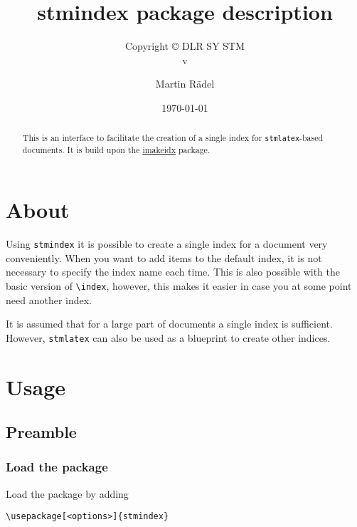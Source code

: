 \documentclass[%
  type=article,%
  layout=koma,%
  conditionallox=true,%
  conditionalloxnewpage=false,%
  date=true,%
  hyperref=true,%
  index=false,%
  listings=true%
]{stmtext}
\author{Martin R\"{a}del}
\title{stmindex package description}
\subtitle{Copyright \copyright{} \the\year{} DLR SY STM\\v\formatdate[versiondatestyle]{\DTMToday}}
\date{\today}
\begin{document}
\maketitle

\begin{abstract}
This is an interface to facilitate the creation of a single index for \texttt{stmlatex}-based documents. It is build upon the \href{https://ctan.org/pkg/imakeidx}{imakeidx} package.
\end{abstract}

\tableofcontents

\conditionallistoffigures  %
\conditionallistoftables   %
\conditionallistoflistings %

\section{About}

Using \texttt{stmindex} it is possible to create a single index for a document very conveniently. When you want to add items to the default index, it is not necessary to specify the index name each time. This is also possible with the basic version of \verb+\index+, however, this makes it easier in case you at some point need another index.

It is assumed that for a large part of documents a single index is sufficient. However, \texttt{stmlatex} can also be used as a blueprint to create other indices.

\section{Usage}%

\subsection{Preamble}

\subsubsection{Load the package}

Load the package by adding

\begin{verbatim}
\usepackage[<options>]{stmindex}
\end{verbatim}
\end{document}
